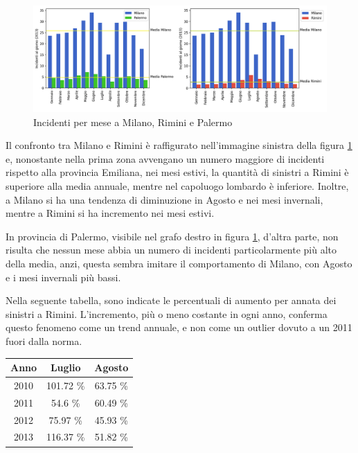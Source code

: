 \documentclass[a4paper,12pt]{report}
\begin{document}
\begin{figure}
    \includegraphics[width=\linewidth]{img_unite/milano_rimini_palermo.png}
    \caption{Incidenti per mese a Milano, Rimini e Palermo}
    \label{fig:milano-rimini}
\end{figure}

Il confronto tra Milano e Rimini è raffigurato nell'immagine sinistra della 
figura \ref{fig:milano-rimini} e, nonostante nella prima zona 
avvengano un numero maggiore di 
incidenti rispetto alla provincia Emiliana, nei mesi estivi, 
la quantità di sinistri a Rimini è superiore alla media annuale, 
mentre nel capoluogo lombardo è inferiore. 
Inoltre, a Milano si ha una tendenza di diminuzione in Agosto e nei 
mesi invernali, mentre a Rimini si ha incremento nei mesi estivi. 

In provincia di Palermo, visibile nel grafo destro in figura \ref{fig:milano-rimini}, 
d'altra parte, non risulta che nessun mese abbia un numero di incidenti 
particolarmente più alto della media, anzi, questa sembra imitare il comportamento di 
Milano, con Agosto e i mesi invernali più bassi. 

Nella seguente tabella, sono indicate le percentuali di aumento per annata dei sinistri 
a Rimini. 
L'incremento, più o meno costante in ogni anno, conferma questo fenomeno come un trend 
annuale, e non come un outlier dovuto a un 2011 fuori dalla norma. 

\begin{center}
    \def\arraystretch{1.5}%
    \begin{tabular}{ |c|c|c| } 
    \hline
    Anno & Luglio   & Agosto \\ 
    \hline
    \rowcolor{TableGray}
    2010 & 101.72 \% & 63.75 \% \\ 
    2011 & 54.6  \%  & 60.49 \% \\
    \rowcolor{TableGray}
    2012 & 75.97 \%  & 45.93 \%\\
    2013 & 116.37 \% & 51.82 \%\\
    \hline
    \end{tabular}
\end{center}
\end{document}
